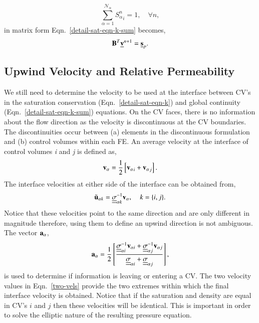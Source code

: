 \documentclass[preprint,authoryear,12pt]{elsarticle}
\newcommand{\frc}{\displaystyle\frac}
\begin{document}
\begin{equation}
  \sum\limits_{\alpha=1}^{\mathcal{N}_{\alpha}} {S_{\alpha}^{n}}_{i} = 1, \quad \forall n,
\end{equation}
in matrix form Eqn.~\ref{detail-sat-eqn-k-sum} becomes,
\begin{equation}
  {\mathbf B}^T \underline{\bf v}^{n+1} = \underline{\bf s}_{p}.
  \label{glob-cty-matrix}
\end{equation}


\subsection{Upwind Velocity and Relative Permeability} \label{opt-up} 
We still need to determine the velocity to be used at the interface between CV's in the saturation conservation (Eqn.~\ref{detail-sat-eqn-k}) and global continuity (Eqn.~\ref{detail-sat-eqn-k-sum}) equations. On the CV faces, there is no information about the flow direction as the velocity is discontinuous at the CV boundaries. The discontinuities occur between (a) elements in the discontinuous formulation and (b) control volumes within each FE. An average velocity at the interface of control volumes {\it i} and {\it j} is defined as,
\begin{equation}
  {\bf v}_\alpha = \frac{1}{2} \left[ {{\bf v}_\alpha}_i + {{\bf v}_\alpha}_j \right].
\end{equation} 
The interface velocities at either side of the interface can be obtained from,
\begin{equation}
  {\tilde{\bf u}}_{\alpha k} = \underline{\underline{\sigma}}_{\alpha k}^{-1}{{\bf v}}_{\alpha}, \;\;\;\; k=\{i,j\}. 
  \label{two-vels}
\end{equation} 
Notice that these velocities point to the same direction and are only different in magnitude therefore, using them to define an upwind direction is not ambiguous. The vector ${\bf a}_{\alpha}$,
\begin{equation}
  {\bf a}_{\alpha} = \frc{1}{2} \left[\frc{ \underline{\underline{\sigma}}_{\alpha i}^{-1}{{\bf v}}_{\alpha i} +  \underline{\underline{\sigma}}_{\alpha j}^{-1}{{\bf v}}_{\alpha j} } { \underline{\underline{\sigma}}_{\alpha i} + \underline{\underline{\sigma}}_{\alpha j} }\right],
\end{equation} 
is used to determine if information is leaving or entering a CV. The two velocity values in Eqn.~\ref{two-vels} provide the two extremes within which the final interface velocity is obtained. Notice that if the saturation and density are equal in CV's $i$ and $j$ then these velocities will be identical. This is important in order to solve the elliptic nature of the resulting pressure equation.
\end{document}
